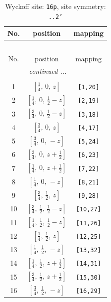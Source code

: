 \documentclass[fleqn,8pt]{jsarticle}
\begin{document}
\renewcommand{\arraystretch}{1.2}
\begin{longtable}{ccc}
\caption{Wyckoff site: {\tt 16p}, site symmetry: {\tt ..2'}}
 \\
 \hline \hline
No. & position & mapping \\ \hline \endfirsthead

\multicolumn{2}{l}{\tablename\ \thetable{}} \\
 \hline \hline
No. & position & mapping \\ \hline \endhead

 \hline \hline
\multicolumn{2}{r}{\footnotesize\it continued ...} \\ \endfoot

 \hline \hline
\multicolumn{2}{r}{} \\ \endlastfoot

1 & $\left[ \frac{1}{4},\, 0,\, z \right]$ & {\tt [1,20]} \\ \hline
2 & $\left[ \frac{1}{4},\, 0,\, \frac{1}{2} - z \right]$ & {\tt [2,19]} \\ \hline
3 & $\left[ \frac{3}{4},\, 0,\, \frac{1}{2} - z \right]$ & {\tt [3,18]} \\ \hline
4 & $\left[ \frac{3}{4},\, 0,\, z \right]$ & {\tt [4,17]} \\ \hline
5 & $\left[ \frac{3}{4},\, 0,\, - z \right]$ & {\tt [5,24]} \\ \hline
6 & $\left[ \frac{3}{4},\, 0,\, z + \frac{1}{2} \right]$ & {\tt [6,23]} \\ \hline
7 & $\left[ \frac{1}{4},\, 0,\, z + \frac{1}{2} \right]$ & {\tt [7,22]} \\ \hline
8 & $\left[ \frac{1}{4},\, 0,\, - z \right]$ & {\tt [8,21]} \\ \hline
9 & $\left[ \frac{3}{4},\, \frac{1}{2},\, z \right]$ & {\tt [9,28]} \\ \hline
10 & $\left[ \frac{3}{4},\, \frac{1}{2},\, \frac{1}{2} - z \right]$ & {\tt [10,27]} \\ \hline
11 & $\left[ \frac{1}{4},\, \frac{1}{2},\, \frac{1}{2} - z \right]$ & {\tt [11,26]} \\ \hline
12 & $\left[ \frac{1}{4},\, \frac{1}{2},\, z \right]$ & {\tt [12,25]} \\ \hline
13 & $\left[ \frac{1}{4},\, \frac{1}{2},\, - z \right]$ & {\tt [13,32]} \\ \hline
14 & $\left[ \frac{1}{4},\, \frac{1}{2},\, z + \frac{1}{2} \right]$ & {\tt [14,31]} \\ \hline
15 & $\left[ \frac{3}{4},\, \frac{1}{2},\, z + \frac{1}{2} \right]$ & {\tt [15,30]} \\ \hline
16 & $\left[ \frac{3}{4},\, \frac{1}{2},\, - z \right]$ & {\tt [16,29]} \\
\end{longtable}
\end{document}
